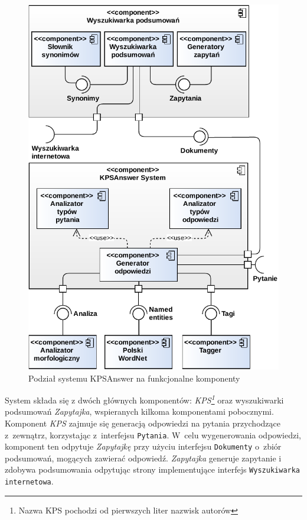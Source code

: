 \begin{figure}[h]
	\centering
	\includegraphics[width=\columnwidth]{figures/WEDT-Komponenty.pdf}
	\caption{Podział systemu KPSAnswer na funkcjonalne komponenty}
	\label{fig:system-components}
\end{figure}

System składa się z dwóch głównych komponentów:
\emph{KPS\footnote{Nazwa KPS pochodzi od pierwszych liter nazwisk autorów}} oraz wyszukiwarki podsumowań \emph{Zapytajka}, wspieranych kilkoma komponentami pobocznymi.
Komponent \emph{KPS} zajmuje się generacją odpowiedzi na pytania przychodzące z~zewnątrz, korzystając z~interfejsu \texttt{Pytania}. W~celu wygenerowania odpowiedzi, komponent ten odpytuje \emph{Zapytajkę} przy użyciu interfejsu \texttt{Dokumenty} o~zbiór podsumowań, mogących zawierać odpowiedź. \emph{Zapytajka} generuje zapytanie i zdobywa podsumowania odpytując strony implementujące interfejs \texttt{Wyszukiwarka internetowa}.


